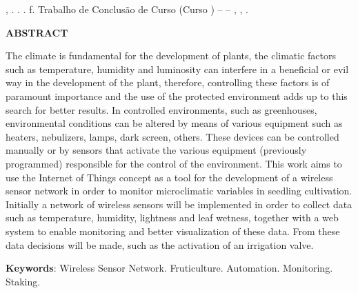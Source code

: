 %
%

\begin{ABSTRACT}

    \begin{SingleSpace}
	   \noindent
		{\expandafter\uppercase\expandafter{\imprimirsobrenomeautor}}, {\imprimirnomeautor}. \textbf{{\imprimirtitulotb}}. {\imprimirdata}. \pageref{LastPage}f. Trabalho de Conclusão de Curso (Curso {\imprimirprograma}) – {\imprimirinstituicao} – {\imprimirdepartamento}, {\imprimirlocal}, {\imprimirdata}.
		
	\end{SingleSpace}
    
    \vspace{1cm}
    
    \begin{center}
	    \textbf{ABSTRACT}
    \end{center}%
    
	\begin{SingleSpace}
		\hspace{-1.3 cm}The climate is fundamental for the development of plants, the climatic factors such as temperature, humidity and luminosity can interfere in a beneficial or evil way in the development of the plant, therefore, controlling these factors is of paramount importance and the use of the protected environment adds up to this search for better results. In controlled environments, such as greenhouses, environmental conditions can be altered by means of various equipment such as heaters, nebulizers, lamps, dark screen, others. These devices can be controlled manually or by sensors that activate the various equipment (previously programmed) responsible for the control of the environment.
		This work aims to use the Internet of Things concept as a tool for the development of a wireless sensor network in order to monitor microclimatic variables in seedling cultivation. Initially a network of wireless sensors will be implemented in order to collect data such as temperature, humidity, lightness and leaf wetness, together with a web system to enable monitoring and better visualization of these data. From these data decisions will be made, such as the activation of an irrigation valve.

		\vspace*{0.5cm}\hspace{-1.3 cm}\textbf{Keywords}: Wireless Sensor Network. Fruticulture. Automation. Monitoring. Staking.

		
	\end{SingleSpace}

\end{ABSTRACT}
